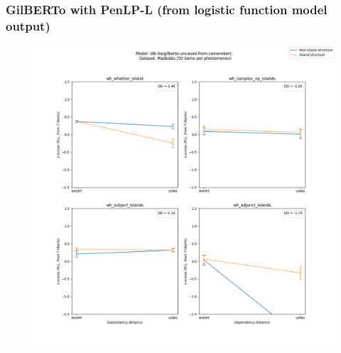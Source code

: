 \subsubsection{GilBERTo with PenLP-L (from logistic function model output)}
\begin{figure}[h]
	\centering
	\includegraphics[width=1\textwidth]{images/AppendixA/Madeddu_wh_idb-ita_gilberto-uncased-from-camembert_PLL-zscores-likert-2022-07-11.png} 
\end{figure}

\clearpage
